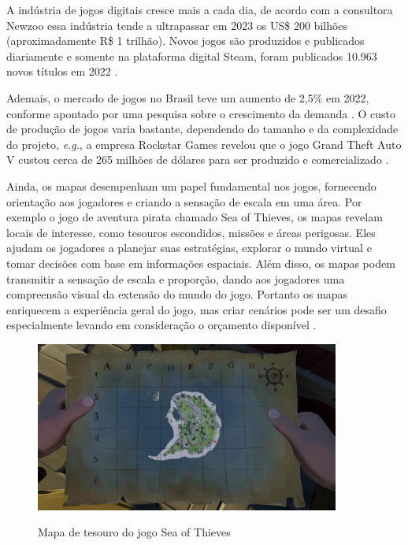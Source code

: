 A indústria de jogos digitais cresce mais a cada dia, de acordo com a consultora Newzoo \space\cite{quanto_games_vao_movimentar} essa indústria tende a ultrapassar em 2023 os US\$ 200 bilhões (aproximadamente R\$ 1 trilhão). Novos jogos são produzidos e publicados diariamente e somente na plataforma digital Steam, foram publicados 10.963 novos títulos em 2022\space
\cite{numero_de_jogos_publicados_na_steam}.

Ademais, o mercado de jogos no Brasil teve um aumento de 2,5\% em 2022, conforme apontado por uma pesquisa sobre o crescimento da demanda \space \cite{pesquisa_games_brasil}. O custo de produção de jogos varia bastante, dependendo do tamanho e da complexidade do projeto, \emph{e.g.}, a empresa Rockstar Games revelou que o jogo Grand Theft Auto V custou cerca de 265 milhões de dólares para ser produzido e comercializado \space
\cite{gta_quanto_custou}.

Ainda, os mapas desempenham um papel fundamental nos jogos, fornecendo orientação aos jogadores e criando a sensação de escala em uma área. Por exemplo o jogo de aventura pirata chamado Sea of Thieves, os mapas revelam locais de interesse, como tesouros escondidos, missões e áreas perigosas. Eles ajudam os jogadores a planejar suas estratégias, explorar o mundo virtual e tomar decisões com base em informações espaciais. Além disso, os mapas podem transmitir a sensação de escala e proporção, dando aos jogadores uma compreensão visual da extensão do mundo do jogo. Portanto os mapas enriquecem a experiência geral do jogo, mas criar cenários pode ser um desafio especialmente levando em consideração o orçamento disponível \cite{video-game-maps, lecafedugeek}.

\begin{figure}[H]
	\caption{Mapa de tesouro do jogo Sea of Thieves}
	\centering %
	\includegraphics[width=10cm]{figures/Treasure_Map.jpg} %
	\label{fig:treasureMap}
\end{figure}

